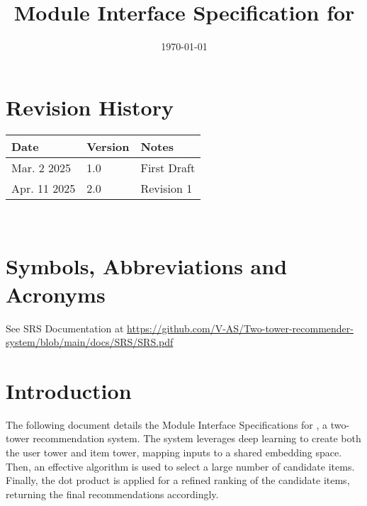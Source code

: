 \documentclass[12pt, titlepage]{article}
\begin{document}
\title{Module Interface Specification for \progname{}}

\author{\authname}

\date{\today}

\maketitle


\section{Revision History}

\begin{tabularx}{\textwidth}{p{3cm}p{2cm}X}
\toprule {\bf Date} & {\bf Version} & {\bf Notes}\\
\midrule
Mar. 2 2025 & 1.0 & First Draft\\
Apr. 11 2025 & 2.0 & Revision 1\\
\bottomrule
\end{tabularx}

~\newpage

\section{Symbols, Abbreviations and Acronyms}

See SRS Documentation at \url{https://github.com/V-AS/Two-tower-recommender-system/blob/main/docs/SRS/SRS.pdf}

\newpage

\tableofcontents

\newpage


\section{Introduction}

The following document details the Module Interface Specifications for
\progname, a two-tower recommendation system. The system leverages deep learning to create both the user tower and item tower, mapping inputs to a shared embedding space. Then, an effective algorithm is used to select a large number of candidate items. Finally, the dot product is applied for a refined ranking of the candidate items, returning the final recommendations accordingly.
\end{document}
